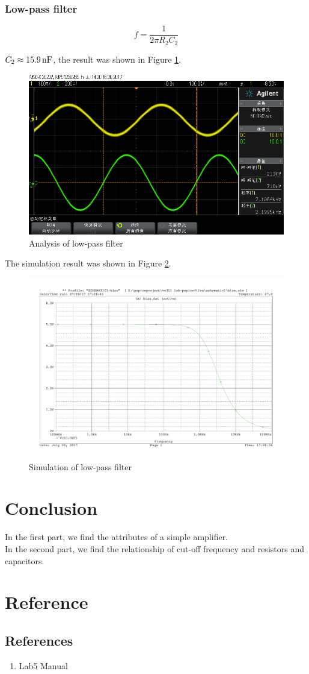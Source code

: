 \documentclass{article}
\newcommand{\unit}[1]{{\rm\,#1}}
\begin{document}
\subsubsection{Low-pass filter}

$$f=\frac{1}{2\pi R_2C_2}$$

$C_2\approx 15.9\unit{nF}$, the result was shown in Figure \ref{fig-2-3}.

\begin{figure}[htbp]
	\centering
	\includegraphics[width=0.6\linewidth]{imgs/scope_26.png}
	\caption{Analysis of low-pass filter}
	\label{fig-2-3}
\end{figure}

The simulation result was shown in Figure \ref{fig-2-4}.

\begin{figure}[htbp]
	\centering
	\includegraphics[width=0.6\linewidth]{imgs/low.png}
	\caption{Simulation of low-pass filter}
	\label{fig-2-4}
\end{figure}

\newpage

\section{Conclusion}

In the first part, we find the attributes of a simple amplifier.\\

In the second part, we find the relationship of cut-off frequency and resistors and capacitors.

\section{Reference}

\subsection{References}
\begin{enumerate}
	\item Lab5 Manual
\end{enumerate}
\end{document}
